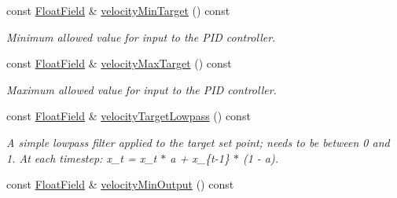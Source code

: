 \begin{DoxyCompactItemize}
\mbox{\label{classhebi_1_1Info_1_1Settings_1_1Actuator_1_1VelocityGains_a6901343fed9430b1874ce444fd415f2f}} 
const \hyperlink{classhebi_1_1Info_1_1FloatField}{Float\+Field} \& \hyperlink{classhebi_1_1Info_1_1Settings_1_1Actuator_1_1VelocityGains_a6901343fed9430b1874ce444fd415f2f}{velocity\+Min\+Target} () const
\begin{DoxyCompactList}\small\item\em Minimum allowed value for input to the P\+ID controller. \end{DoxyCompactList}\item 
\mbox{\label{classhebi_1_1Info_1_1Settings_1_1Actuator_1_1VelocityGains_ab5aa7d4af03b7d995617d56e71c10369}} 
const \hyperlink{classhebi_1_1Info_1_1FloatField}{Float\+Field} \& \hyperlink{classhebi_1_1Info_1_1Settings_1_1Actuator_1_1VelocityGains_ab5aa7d4af03b7d995617d56e71c10369}{velocity\+Max\+Target} () const
\begin{DoxyCompactList}\small\item\em Maximum allowed value for input to the P\+ID controller. \end{DoxyCompactList}\item 
\mbox{\label{classhebi_1_1Info_1_1Settings_1_1Actuator_1_1VelocityGains_aa5099bb7409c2f6e4d1cef72ca4275b2}} 
const \hyperlink{classhebi_1_1Info_1_1FloatField}{Float\+Field} \& \hyperlink{classhebi_1_1Info_1_1Settings_1_1Actuator_1_1VelocityGains_aa5099bb7409c2f6e4d1cef72ca4275b2}{velocity\+Target\+Lowpass} () const
\begin{DoxyCompactList}\small\item\em A simple lowpass filter applied to the target set point; needs to be between 0 and 1. At each timestep\+: x\+\_\+t = x\+\_\+t $\ast$ a + x\+\_\+\{t-\/1\} $\ast$ (1 -\/ a). \end{DoxyCompactList}\item 
\mbox{\label{classhebi_1_1Info_1_1Settings_1_1Actuator_1_1VelocityGains_a80501ce67ca67de1c8941827d315ab4d}} 
const \hyperlink{classhebi_1_1Info_1_1FloatField}{Float\+Field} \& \hyperlink{classhebi_1_1Info_1_1Settings_1_1Actuator_1_1VelocityGains_a80501ce67ca67de1c8941827d315ab4d}{velocity\+Min\+Output} () const

\end{DoxyCompactItemize}
